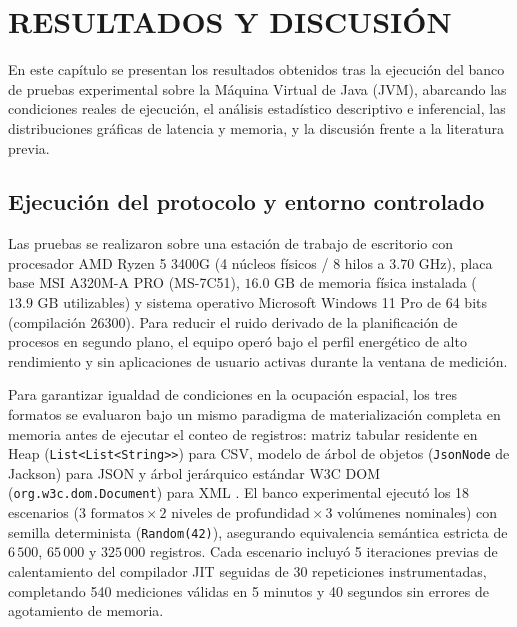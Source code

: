 \section{RESULTADOS Y DISCUSIÓN}

En este capítulo se presentan los resultados obtenidos tras la ejecución del banco de pruebas experimental sobre la Máquina Virtual de Java (JVM), abarcando las condiciones reales de ejecución, el análisis estadístico descriptivo e inferencial, las distribuciones gráficas de latencia y memoria, y la discusión frente a la literatura previa.

\subsection{Ejecución del protocolo y entorno controlado}

Las pruebas se realizaron sobre una estación de trabajo de escritorio con procesador AMD Ryzen 5 3400G (4 núcleos físicos / 8 hilos a $3.70\text{ GHz}$), placa base MSI A320M-A PRO (MS-7C51), $16.0\text{ GB}$ de memoria física instalada ($13.9\text{ GB}$ utilizables) y sistema operativo Microsoft Windows 11 Pro de 64 bits (compilación 26300). Para reducir el ruido derivado de la planificación de procesos en segundo plano, el equipo operó bajo el perfil energético de alto rendimiento y sin aplicaciones de usuario activas durante la ventana de medición.

Para garantizar igualdad de condiciones en la ocupación espacial, los tres formatos se evaluaron bajo un mismo paradigma de materialización completa en memoria antes de ejecutar el conteo de registros: matriz tabular residente en Heap (\texttt{List<List<String>{}>}) para CSV, modelo de árbol de objetos (\texttt{JsonNode} de Jackson) para JSON y árbol jerárquico estándar W3C DOM (\texttt{org.w3c.dom.Document}) para XML \cite{w3cdom2004}. El banco experimental ejecutó los 18 escenarios ($3\text{ formatos} \times 2\text{ niveles de profundidad} \times 3\text{ volúmenes nominales}$) con semilla determinista (\texttt{Random(42)}), asegurando equivalencia semántica estricta de $6\,500$, $65\,000$ y $325\,000$ registros. Cada escenario incluyó 5 iteraciones previas de calentamiento del compilador JIT seguidas de 30 repeticiones instrumentadas, completando 540 mediciones válidas en 5 minutos y 40 segundos sin errores de agotamiento de memoria.

